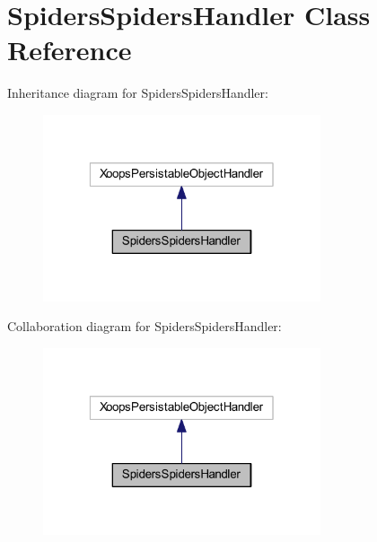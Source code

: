 \hypertarget{class_spiders_spiders_handler}{\section{Spiders\-Spiders\-Handler Class Reference}
\label{class_spiders_spiders_handler}
}


Inheritance diagram for Spiders\-Spiders\-Handler\-:
\nopagebreak
\begin{figure}[H]
\begin{center}
\leavevmode
\includegraphics[width=232pt]{class_spiders_spiders_handler__inherit__graph}
\end{center}
\end{figure}


Collaboration diagram for Spiders\-Spiders\-Handler\-:
\nopagebreak
\begin{figure}[H]
\begin{center}
\leavevmode
\includegraphics[width=232pt]{class_spiders_spiders_handler__coll__graph}
\end{center}
\end{figure}
